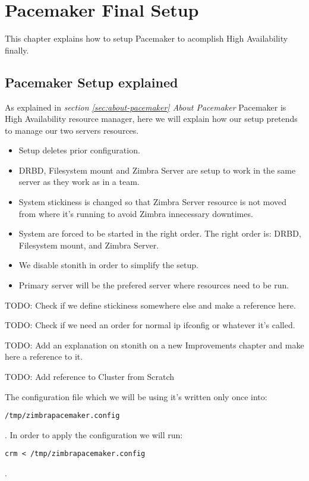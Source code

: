 

\chapter{Pacemaker Final Setup}
This chapter explains how to setup Pacemaker to acomplish High Availability finally.

\section {Pacemaker Setup explained}
As explained in \textit{section \ref{sec:about-pacemaker} About Pacemaker} Pacemaker is High Availability resource manager, here we will explain how our setup pretends to manage our two servers resources.

\begin{itemize}
  \item Setup deletes prior configuration.
  \item DRBD, Filesystem mount and Zimbra Server are setup to work in the same server as they work as in a team.
  \item System stickiness is changed so that Zimbra Server resource is not moved from where it's running to avoid Zimbra innecessary downtimes.
  \item System are forced to be started in the right order. The right order is: DRBD, Filesystem mount, and Zimbra Server.
  \item We disable stonith in order to simplify the setup.
  \item Primary server will be the prefered server where resources need to be run.
\end{itemize}

TODO: Check if we define stickiness somewhere else and make a reference here.

TODO: Check if we need an order for normal ip ifconfig or whatever it's called.

TODO: Add an explanation on stonith on a new Improvements chapter and make here a reference to it.

TODO: Add reference to Cluster from Scratch

The configuration file which we will be using it's written only once into:
\begin{verbatim}
/tmp/zimbrapacemaker.config
\end{verbatim}
. In order to apply the configuration we will run:
\begin{verbatim}
crm < /tmp/zimbrapacemaker.config
\end{verbatim}
.

